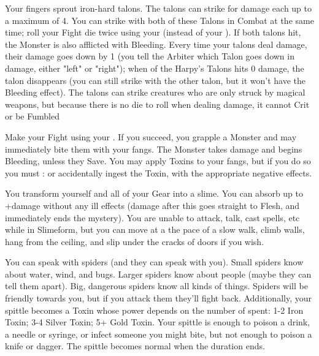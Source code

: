 {\MYSTERY [
  Name = Harpy's Talons,
  Link = arcana-mystery-harpys-talons,
  Paradigm = Force,
  Save = n/a,
  Duration = Session,
  Target = Self
]

Your fingers sprout iron-hard talons.  The talons can strike for \DICE damage each up to a maximum of 4.  You can strike with both of these Talons in Combat at the same time; roll your Fight die twice using your \FOC (instead of your \VIG).  If both talons hit, the Monster is also afflicted with Bleeding.  Every time your talons deal damage, their damage goes down by 1 (you tell the Arbiter which Talon goes down in damage, either "left" or "right"); when  of the Harpy's Talons hits 0 damage, the talon disappears (you can still strike with the other talon, but it won't have the Bleeding effect). The talons can strike creatures who are only struck by magical weapons, but because there is no die to roll when dealing damage, it cannot Crit or be Fumbled

\MYSTERY [
  Name = Serpent's Fang,
  Link = arcana-mystery-serpents-fang,
  Paradigm = Biomancy,
  Save = n/a,
  Duration = Combat or \SUM Minutes,
  Target = Self
]

Make your Fight \RO using your \FOC.  If you succeed, you grapple a Monster and may immediately bite them with your fangs.  The Monster takes \DICE damage and begins Bleeding, unless they Save.  You may apply Toxins to your fangs, but if you do so you must \RS : \FOC or accidentally ingest the Toxin, with the appropriate negative effects.

\MYSTERY [
  Name = Slimeform,
  Link = arcana-mystery-slimeform,
  Paradigm = Biomancy,
  Save = n/a,
  Duration = \SUM Minutes,
  Target = Self
]

You transform yourself and all of your Gear into a slime.  You can absorb up to \SUMDICE+\DICE damage without any ill effects (damage after this goes straight to Flesh, and immediately ends the mystery).  You are unable to attack, talk, cast spells, etc while in Slimeform, but you can move at a the pace of a slow walk, climb walls, hang from the ceiling, and slip under the cracks of doors if you wish.

\MYSTERY [
  Name = Spidertongue,
  Link = arcana-mystery-spidertongue,
  Paradigm = Biomancy,
  Save = Y (neg.),
  Duration = Combat or \SUM Minutes,
  Target = Self
]

You can speak with spiders (and they can speak with you).  Small spiders know about water, wind, and bugs.  Larger spiders know about people (maybe they can tell them apart).  Big, dangerous spiders know all kinds of things.  Spiders will be friendly towards you, but if you attack them they'll fight back.  Additionally, your spittle becomes a Toxin whose power depends on the number of \DICE spent: 1-2 \DICE Iron Toxin; 3-4 \DICE Silver Toxin; 5+ \DICE Gold Toxin.  Your spittle is enough to poison a drink, a needle or syringe, or infect someone you might bite, but not enough to poison a knife or dagger.  The spittle becomes normal when the duration ends.


}
